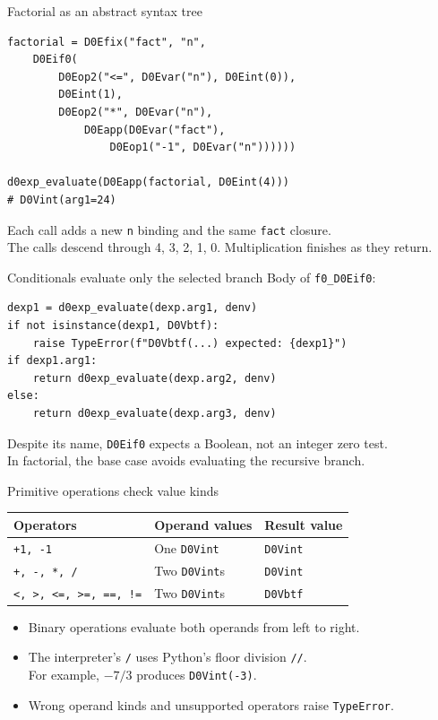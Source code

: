 \documentclass[aspectratio=169,11pt]{beamer}
\begin{document}
\begin{frame}[fragile]{Factorial as an abstract syntax tree}
\begin{lstlisting}
factorial = D0Efix("fact", "n",
    D0Eif0(
        D0Eop2("<=", D0Evar("n"), D0Eint(0)),
        D0Eint(1),
        D0Eop2("*", D0Evar("n"),
            D0Eapp(D0Evar("fact"),
                D0Eop1("-1", D0Evar("n"))))))

d0exp_evaluate(D0Eapp(factorial, D0Eint(4)))
# D0Vint(arg1=24)
\end{lstlisting}
\medskip
Each call adds a new \texttt{n} binding and the same \texttt{fact} closure.\\[0.6em]
The calls descend through 4, 3, 2, 1, 0. Multiplication finishes as they return.
\end{frame}

\begin{frame}[fragile]{Conditionals evaluate only the selected branch}
Body of \texttt{f0\_D0Eif0}:
\begin{lstlisting}
dexp1 = d0exp_evaluate(dexp.arg1, denv)
if not isinstance(dexp1, D0Vbtf):
    raise TypeError(f"D0Vbtf(...) expected: {dexp1}")
if dexp1.arg1:
    return d0exp_evaluate(dexp.arg2, denv)
else:
    return d0exp_evaluate(dexp.arg3, denv)
\end{lstlisting}
\medskip
Despite its name, \texttt{D0Eif0} expects a Boolean, not an integer zero test.\\[0.6em]
In factorial, the base case avoids evaluating the recursive branch.
\end{frame}

\begin{frame}{Primitive operations check value kinds}
\begin{center}
\begin{tabular}{lll}\toprule
Operators & Operand values & Result value\\\midrule
\texttt{+1, -1} & One \texttt{D0Vint} & \texttt{D0Vint}\\
\texttt{+, -, *, /} & Two \texttt{D0Vint}s & \texttt{D0Vint}\\
\texttt{<, >, <=, >=, ==, !=} & Two \texttt{D0Vint}s & \texttt{D0Vbtf}\\\bottomrule
\end{tabular}
\end{center}
\bigskip
\begin{itemize}
\item Binary operations evaluate both operands from left to right.
\item The interpreter's \texttt{/} uses Python's floor division \texttt{//}.\\
For example, $-7/3$ produces \texttt{D0Vint(-3)}.
\item Wrong operand kinds and unsupported operators raise \texttt{TypeError}.
\end{itemize}
\end{frame}
\end{document}
